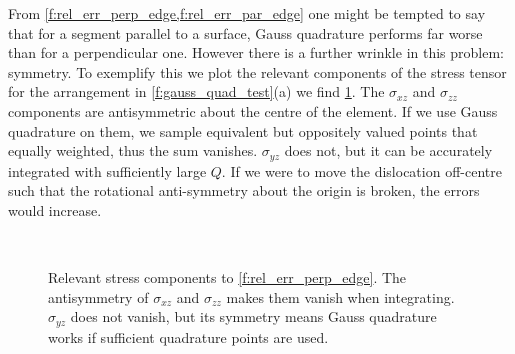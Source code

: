 \documentclass[11pt]{iopart}
\begin{document}
From \cref{f:rel_err_perp_edge,f:rel_err_par_edge} one might be tempted to say that for a segment parallel to a surface, Gauss quadrature performs far worse than for a perpendicular one. However there is a further wrinkle in this problem: symmetry. To exemplify this we plot the relevant components of the stress tensor for the arrangement in \cref{f:gauss_quad_test}(a) we find \cref{f:sigma_perp_edge}. The $\sigma_{xz}$ and $\sigma_{zz}$ components are antisymmetric about the centre of the element. If we use Gauss quadrature on them, we sample equivalent but oppositely valued points that equally weighted, thus the sum vanishes. $\sigma_{yz}$ does not, but it can be accurately integrated with sufficiently large $Q$. If we were to move the dislocation off-centre such that the rotational anti-symmetry about the origin is broken, the errors would increase.
\begin{figure}
    \centering
    ~
    ~
    \caption{Relevant stress components to \cref{f:rel_err_perp_edge}. The antisymmetry of $\sigma_{xz}$ and $\sigma_{zz}$ makes them vanish when integrating. $\sigma_{yz}$ does not vanish, but its symmetry means Gauss quadrature works if sufficient quadrature points are used.}
    \label{f:sigma_perp_edge}
\end{figure}
\end{document}
